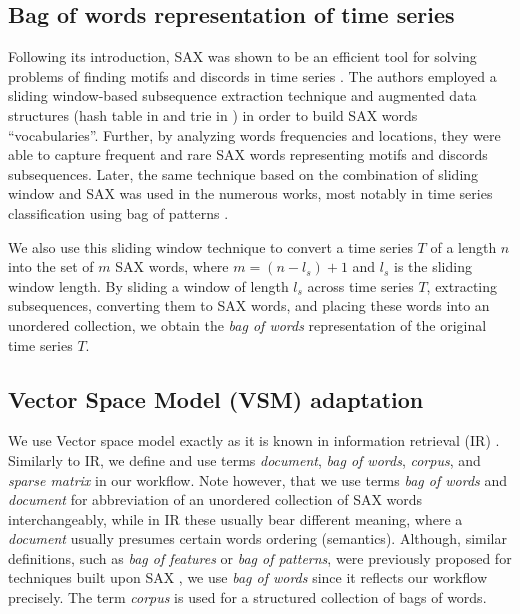 \documentclass[conference]{IEEEtran}
\begin{document}
\subsection{Bag of words representation of time series} \label{bow_representation}
Following its introduction, SAX was shown to be an efficient tool for solving problems 
of finding motifs and discords in time series \cite{motifs, hot_sax}. 
The authors employed a sliding window-based subsequence extraction technique 
and augmented data structures (hash table in \cite{motifs} and trie in \cite{hot_sax}) 
in order to build SAX words ``vocabularies''. Further, by analyzing words frequencies 
and locations, they were able to capture frequent and rare SAX words representing 
motifs and discords subsequences. Later, the same technique based on the combination 
of sliding window and SAX was used in the numerous works, most notably in time series 
classification using bag of patterns \cite{bag_patterns}. 

We also use this sliding window technique to convert a time series $T$ of a length $n$ into 
the set of $m$ SAX words, where $m=(n-l_{s})+1$ and $l_{s}$ is the sliding window length. 
By sliding a window of length $l_{s}$ across time series $T$, extracting subsequences, 
converting them to SAX words, and placing these words into an unordered collection, 
we obtain the \textit{bag of words} representation of the original time series $T$.

\subsection{Vector Space Model (VSM) adaptation}
We use Vector space model exactly as it is known in information retrieval (IR) \cite{salton}. 
Similarly to IR, we define and use terms \textit{document}, \textit{bag of words}, 
\textit{corpus}, and \textit{sparse matrix} in our workflow. 
Note however, that we use terms \textit{bag of words} and \textit{document} 
for abbreviation of an unordered collection of SAX words interchangeably, while 
in IR these usually bear different meaning, where a \textit{document} usually 
presumes certain words ordering (semantics). 
Although, similar definitions, such as \textit{bag of features} or 
\textit{bag of patterns}, were previously proposed for techniques built upon 
SAX \cite{bag_patterns}, we use \textit{bag of words} since it reflects our 
workflow precisely. The term \textit{corpus} is used for a structured collection 
of bags of words. 
\end{document}

